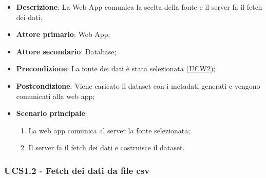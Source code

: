 \begin{itemize}

	\item \textbf{Descrizione}: La Web App comunica la scelta della fonte e il server fa il fetch dei dati.

	\item \textbf{Attore primario}: Web App;
	\item \textbf{Attore secondario}: Database;

	\item \textbf{Precondizione}:   La fonte dei dati è stata selezionata (\hyperref[sub:ucw2]{UCW2});

	\item \textbf{Postcondizione}:  Viene caricato il dataset con i metadati generati e vengono comunicati alla web app;

	\item \textbf{Scenario principale}:
	      \begin{enumerate}
		      \item La web app comunica al server la fonte selezionata;
		      \item Il server fa il fetch dei dati e costruisce il dataset.
	      \end{enumerate}

\end{itemize}


\subsubsection{UCS1.2 - Fetch dei dati da file csv}
\label{ssub:ucs1.2}

